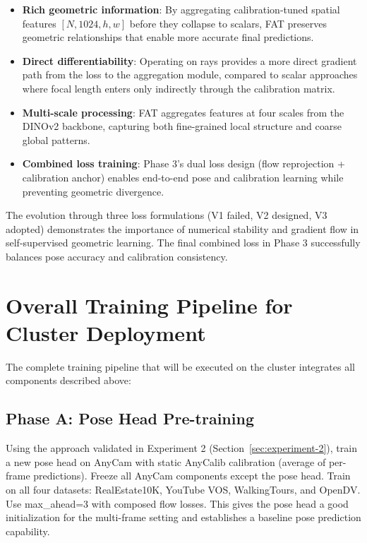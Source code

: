 \begin{itemize}
    \item \textbf{Rich geometric information}: By aggregating calibration-tuned spatial features $[N, 1024, h, w]$ before they collapse to scalars, FAT preserves geometric relationships that enable more accurate final predictions.

    \item \textbf{Direct differentiability}: Operating on rays provides a more direct gradient path from the loss to the aggregation module, compared to scalar approaches where focal length enters only indirectly through the calibration matrix.

    \item \textbf{Multi-scale processing}: FAT aggregates features at four scales from the DINOv2 backbone, capturing both fine-grained local structure and coarse global patterns.

    \item \textbf{Combined loss training}: Phase 3's dual loss design (flow reprojection + calibration anchor) enables end-to-end pose and calibration learning while preventing geometric divergence.
\end{itemize}

The evolution through three loss formulations (V1 failed, V2 designed, V3 adopted) demonstrates the importance of numerical stability and gradient flow in self-supervised geometric learning. The final combined loss in Phase 3 successfully balances pose accuracy and calibration consistency.

\section{Overall Training Pipeline for Cluster Deployment}\label{sec:overall-pipeline}

The complete training pipeline that will be executed on the cluster integrates all components described above:

\subsection{Phase A: Pose Head Pre-training}

Using the approach validated in Experiment 2 (Section~\ref{sec:experiment-2}), train a new pose head on AnyCam with static AnyCalib calibration (average of per-frame predictions). Freeze all AnyCam components except the pose head. Train on all four datasets: RealEstate10K, YouTube VOS, WalkingTours, and OpenDV. Use max\_ahead=3 with composed flow losses. This gives the pose head a good initialization for the multi-frame setting and establishes a baseline pose prediction capability.

